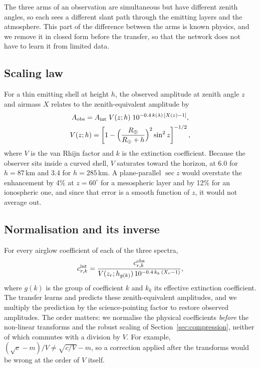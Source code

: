 The three arms of an observation are simultaneous but have different zenith
angles, so each sees a different slant path through the emitting layers and
the atmosphere. This part of the difference between the arms is known
physics, and we remove it in closed form before the transfer, so that the
network does not have to learn it from limited data.

\subsection{Scaling law}

For a thin emitting shell at height $h$, the observed amplitude at zenith
angle $z$ and airmass $X$ relates to the zenith-equivalent amplitude by
\begin{equation}
\begin{gathered}
  A_{\rm obs} = A_{\rm int}\;V(z;h)\;10^{-0.4\,k(\lambda)\,[X(z)-1]},\\
  V(z;h) = \left[1-\Big(\frac{R_\oplus}{R_\oplus+h}\Big)^2\sin^2 z\right]^{-1/2},
\end{gathered}
  \label{eq:vanrhijn}
\end{equation}
where $V$ is the van Rhijn factor \citep{vanRhijn1921} and $k$ is the
extinction coefficient. Because the observer sits inside a curved shell, $V$
saturates toward the horizon, at 6.0 for $h = 87$\,km and 3.4 for
$h = 285$\,km. A plane-parallel $\sec z$ would overstate the enhancement by
4\% at $z = 60^\circ$ for a mesospheric layer and by 12\% for an ionospheric
one, and since that error is a smooth function of $z$, it would not average
out.

\subsection{Normalisation and its inverse}
\label{sec:normalisation}

For every airglow coefficient of each of the three spectra,
\begin{equation}
  c^{\rm int}_{r,k} = \frac{c^{\rm obs}_{r,k}}{V(z_r;h_{g(k)})\,10^{-0.4\,k_k\,(X_r-1)}},
\end{equation}
where $g(k)$ is the group of coefficient $k$ and $k_k$ its effective
extinction coefficient. The transfer learns and predicts these
zenith-equivalent amplitudes, and we multiply the prediction by the
science-pointing factor to restore observed amplitudes. The order matters:
we normalise the physical coefficients \emph{before} the non-linear
transforms and the robust scaling of Section~\ref{sec:compression}, neither
of which commutes with a division by $V$. For example,
$(\sqrt{c}-m)/V \neq \sqrt{c/V}-m$, so a correction applied after the
transforms would be wrong at the order of $V$ itself.

